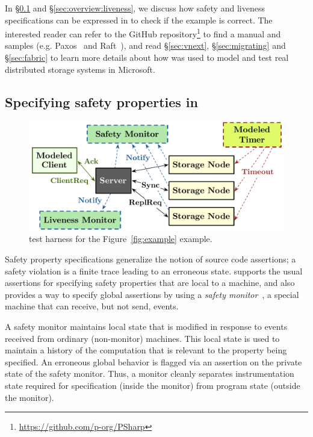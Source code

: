In \S\ref{sec:overview:safety} and \S\ref{sec:overview:liveness}, we discuss how safety and liveness specifications can be expressed in \psharp to check if the example is correct. The interested reader can refer to the \psharp GitHub repository\footnote{\url{https://github.com/p-org/PSharp}} to find a manual and samples (e.g. Paxos~\cite{lamport1998part} and Raft~\cite{ongaro2014raft}), and read \S\ref{sec:vnext}, \S\ref{sec:migrating} and \S\ref{sec:fabric} to learn more details about how \psharp was used to model and test real distributed storage systems in Microsoft.

\vspace{-1mm}
\subsection{Specifying safety properties in \psharp}
\label{sec:overview:safety}

\begin{figure}[t]
\centering
\includegraphics[width=\linewidth]{img/example}
\vspace{-5mm}
\caption{\psharp test harness for the Figure~\ref{fig:example} example.}
\label{fig:example:model}
\vspace{-2mm}
\end{figure}

Safety property specifications generalize the notion of source code assertions; a safety violation is a finite trace leading to an erroneous state. \psharp supports the usual assertions for specifying safety properties that are local to a \psharp machine, and also provides a way to specify global assertions by using a \emph{safety monitor}~\cite{desai2015building}, a special \psharp machine that can receive, but not send, events.

A safety monitor maintains local state that is modified in response to events received from ordinary (non-monitor) machines. This local state is used to maintain a history of the computation that is relevant to the property being specified. An erroneous global behavior is flagged via an assertion on the private state of the safety monitor. Thus, a monitor cleanly separates instrumentation state required for specification (inside the monitor) from program state (outside the monitor).

